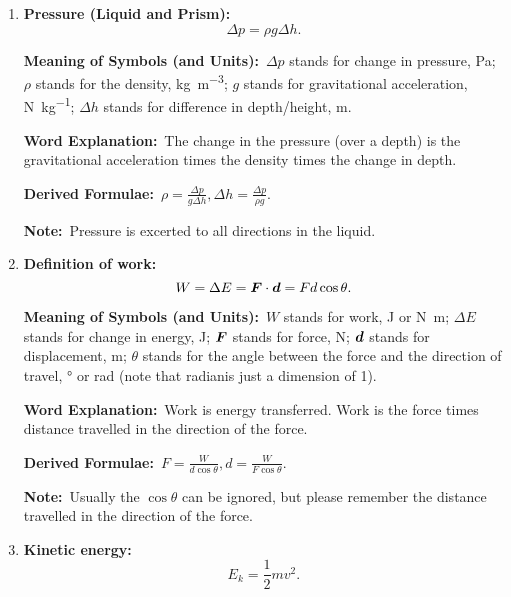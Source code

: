 \documentclass[8pt]{article}
\newcommand{\MeanSymb}{\textbf{Meaning of Symbols (and Units):}\ }
\newcommand{\WordExpl}{\textbf{Word Explanation:}\ }
\newcommand{\DeriForm}{\textbf{Derived Formulae:}\ }
\newcommand{\Note}{\textbf{Note:}\ }
\begin{document}
\begin{enumerate}
                \DeriForm \(F = pA, A = \frac{F}{p}\).

                \Note Though force is a vector, pressure is a scalar. This will be more significant in the next formula.

                \item \textbf{Pressure (Liquid and Prism):}
                \[
                    \Delta p = \rho g \Delta h.
                \]

                \MeanSymb \(\Delta p\) stands for change in pressure, \unit{\pascal}; \(\rho\) stands for the density, \unit{\kilogram\per\metre\cubed}; \(g\) stands for gravitational acceleration, \unit{\newton \per \kilogram}; \(\Delta h\) stands for difference in depth/height, \unit{\metre}.

                \WordExpl The change in the pressure (over a depth) is the gravitational acceleration times the density times the change in depth.

                \DeriForm \(\rho = \frac{\Delta p}{g \Delta h}, \Delta h = \frac{\Delta p}{\rho g}\).

                \Note Pressure is excerted to all directions in the liquid.

                \item \textbf{Definition of work:}
                \[
                    W = \Delta E = \boldsymbol{F} \cdot \boldsymbol{d} = Fd \cos \theta.
                \]

                \MeanSymb \(W\) stands for work, \unit{\joule} or \unit{\newton \metre}; \(\Delta E\) stands for change in energy, \unit{\joule}; \(\boldsymbol{F}\) stands for force, \unit{\newton}; \(\boldsymbol{d}\) stands for displacement, \unit{\metre}; \(\theta\) stands for the angle between the force and the direction of travel, \unit{\degree} or \unit{\radian} (note that radianis just a dimension of 1).

                \WordExpl Work is energy transferred. Work is the force times distance travelled in the direction of the force.

                \DeriForm \(F = \frac{W}{d \cos \theta}, d = \frac{W}{F \cos \theta}\).

                \Note Usually the \(\cos \theta\) can be ignored, but please remember the distance travelled in the direction of the force.

                \item \textbf{Kinetic energy:}
                \[
                    E_k = \frac{1}{2} m v^2.
                \]


\end{enumerate}
\end{document}
